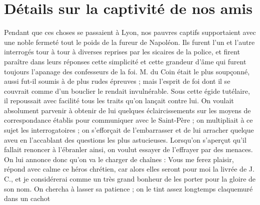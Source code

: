 \section*{Détails sur la captivité de nos amis}
Pendant que ces choses se passaient à Lyon, nos pauvres captifs supportaient avec une noble fermeté tout le poids de la fureur de Napoléon. Ils furent l'un et l'autre interrogés tour à tour à diverses reprises par les sicaires de la police, et firent paraître dans leurs réponses cette simplicité et cette grandeur d'âme qui furent toujours l'apanage des confesseurs de la foi. M. du Coin était le plus soupçonné, aussi fut-il soumis à de plus rudes épreuves ; mais l'esprit de foi dont il se couvrait comme d'un bouclier le rendait invulnérable. Sous cette égide tutélaire, il repoussait avec facilité tous les traits qu'on lançait contre lui. On voulait absolument parvenir à obtenir de lui quelques éclaircissements sur les moyens de correspondance établis pour communiquer avec le Saint-Père ; on multipliait à ce sujet les interrogatoires ; on s'efforçait de l'embarrasser et de lui arracher quelque aveu en l'accablant des questions les plus astucieuses. Lorsqu'on s'aperçut qu'il fallait renoncer à l'ébranler ainsi, on voulut essayer de l'effrayer par des menaces. On lui annonce donc qu'on va le charger de chaînes : Vous me ferez plaisir, répond avec calme ce héros chrétien, car alors elles seront pour moi la livrée de J. C., et je considérerai comme un très grand bonheur de les porter pour la gloire de son nom. On chercha à lasser sa patience ; on le tint assez longtemps claquemuré dans un cachot
